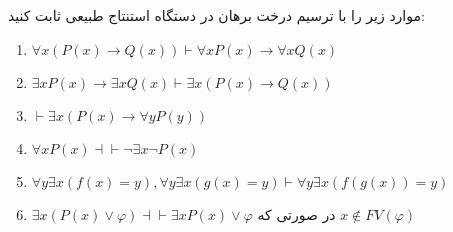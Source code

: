 
	موارد زیر را با ترسیم درخت برهان در دستگاه استنتاج طبیعی ثابت کنید:
	\begin{enumerate}[label=(\alph*)]
		\item 
			$\forall x (P(x) \to Q(x)) \vdash \forall x P(x) \to \forall x Q(x)$
		\item 
			$\exists x P(x) \to \exists x Q(x) \vdash \exists x(P(x) \to Q(x))$
		\item 
			$\vdash \exists x (P(x) \to \forall y P(y))$
		\item
			$\forall x P(x) \dashv\vdash \neg \exists x \neg 	P(x)$
		\item
			$\forall y \exists x (f(x) = y), \forall y \exists x (g(x) = y) \vdash \forall y \exists x (f(g(x)) = y)$
		\item
			$\exists x(P(x) \vee \varphi) \dashv\vdash \exists x P(x) \vee \varphi$
			در صورتی که
			$x \notin FV(\varphi)$
	\end{enumerate}
